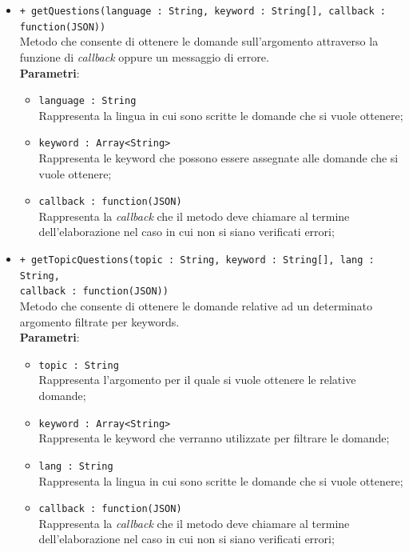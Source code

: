 \begin{itemize}
\begin{itemize}
			\item \texttt{+ getQuestions(language : String, keyword : String[], callback : function(JSON))} \\
			Metodo che consente di ottenere le domande sull'argomento attraverso la funzione di \textit{callback} oppure un messaggio di errore. \\
			\textbf{Parametri}:
			\begin{itemize}
				\item \texttt{language : String} \\
				Rappresenta la lingua in cui sono scritte le domande che si vuole ottenere;
				\item \texttt{keyword : Array<String>} \\
				Rappresenta le keyword che possono essere assegnate alle domande che si vuole ottenere;
				\item \texttt{callback : function(JSON)} \\
				Rappresenta la \textit{callback} che il metodo deve chiamare al termine dell'elaborazione nel caso in cui non si siano verificati errori;
			\end{itemize}
			\item \texttt{+ getTopicQuestions(topic : String, keyword : String[],  lang : String, \\callback : function(JSON))} \\
			Metodo che consente di ottenere le domande relative ad un determinato argomento filtrate per keywords. \\
			\textbf{Parametri}:
			\begin{itemize}
				\item \texttt{topic : String} \\
				Rappresenta l'argomento per il quale si vuole ottenere le relative domande;
				\item \texttt{keyword : Array<String>} \\
				Rappresenta le keyword che verranno utilizzate per filtrare le domande;
				\item \texttt{lang : String} \\
				Rappresenta la lingua in cui sono scritte le domande che si vuole ottenere;
				\item \texttt{callback : function(JSON)} \\
				Rappresenta la \textit{callback} che il metodo deve chiamare al termine dell'elaborazione nel caso in cui non si siano verificati errori;
			\end{itemize}

\end{itemize}
\end{itemize}
